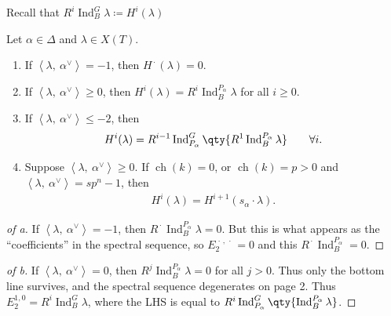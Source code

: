 Recall that
\(R^i \operatorname{Ind}_B^G \lambda \coloneqq H^i(\lambda)\)

\begin{proposition}[?]

Let \(\alpha\in\Delta\) and \(\lambda \in X(T)\).

\begin{enumerate}
\def\labelenumi{\arabic{enumi}.}
\item
  If \({\left\langle {\lambda},~{\alpha^\vee} \right\rangle} = -1\),
  then \(H^{\,\cdot\,}(\lambda) = 0\).
\item
  If \({\left\langle {\lambda},~{ \alpha^\vee} \right\rangle} \geq 0\),
  then \(H^i(\lambda) = R^i \operatorname{Ind}_B^{P_\alpha} \lambda\)
  for all \(i\geq 0\).
\item
  If \({\left\langle {\lambda},~{\alpha^\vee} \right\rangle} \leq -2\),
  then
  \begin{align*}  
  H^i(\lambda) = R^{i-1} \operatorname{Ind}_{P_\alpha}^G \qty{ R^1 \operatorname{Ind}_B^{P_\alpha} \lambda } \qquad \forall i
  .\end{align*}
\item
  Suppose
  \({\left\langle {\lambda},~{\alpha^\vee} \right\rangle} \geq 0\). If
  \(\operatorname{ch}(k) = 0\), or \(\operatorname{ch}(k) = p> 0\) and
  \({\left\langle {\lambda},~{\alpha^\vee} \right\rangle} = sp^n - 1\),
  then
  \begin{align*}  
    H^i(\lambda) = H^{i+1}(s_\alpha\cdot \lambda)
    .\end{align*}
\end{enumerate}

\end{proposition}

\begin{proof}[of a]

If \({\left\langle {\lambda},~{\alpha^\vee} \right\rangle} = -1\), then
\(R^{\,\cdot\,}\operatorname{Ind}_B^{P_\alpha} \lambda = 0\). But this
is what appears as the ``coefficients'' in the spectral sequence, so
\(E_2^{{\,\cdot\,}, {\,\cdot\,}} = 0\) and this
\(R^{\,\cdot\,}\operatorname{Ind}_B^{P_\alpha} = 0\).

\end{proof}

\begin{proof}[of b]

If \({\left\langle {\lambda},~{\alpha^\vee} \right\rangle} = 0\), then
\(R^j \operatorname{Ind}_B^{P_\alpha} \lambda = 0\) for all \(j>0\).
Thus only the bottom line survives, and the spectral sequence
degenerates on page 2. Thus
\(E_2^{1, 0} = R^i \operatorname{Ind}_B^G \lambda\), where the LHS is
equal to
\(R^i \operatorname{Ind}_{P_\alpha}^G \qty{\operatorname{Ind}_B^{P_\alpha} \lambda }\).

\end{proof}

